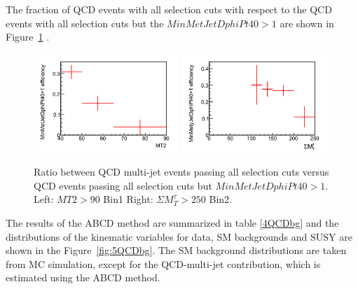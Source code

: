 The fraction of QCD events with all selection cuts with respect to the QCD events with all selection cuts but the
$MinMetJetDphiPt40>1$ are shown in Figure~\ref{fig:3QCDbg} .

\begin{figure}[htbp]
\centering
\includegraphics[width=0.49\textwidth]{QCDbginTauTau/Bin1_miscefficiency.png}
\includegraphics[width=0.49\textwidth]{QCDbginTauTau/Bin2_miscefficiency.png} \\
\caption{ Ratio between QCD multi-jet events passing all selection cuts versus QCD events
 passing all selection cuts but $MinMetJetDphiPt40>1$. Left:  $MT2>90$ Bin1   Right:  $\Sigma M_{T}^{\tau} >250$ Bin2.}
\label{fig:3QCDbg}
\end{figure}




The results of the ABCD method are summarized in table \ref{4QCDbg} and the distributions of the kinematic variables  for data, SM backgrounds and SUSY are shown in the Figure~\ref{fig:5QCDbg}. The SM background distributions
are taken from MC simulation, except for the QCD-multi-jet contribution, which is estimated
using the ABCD method.



